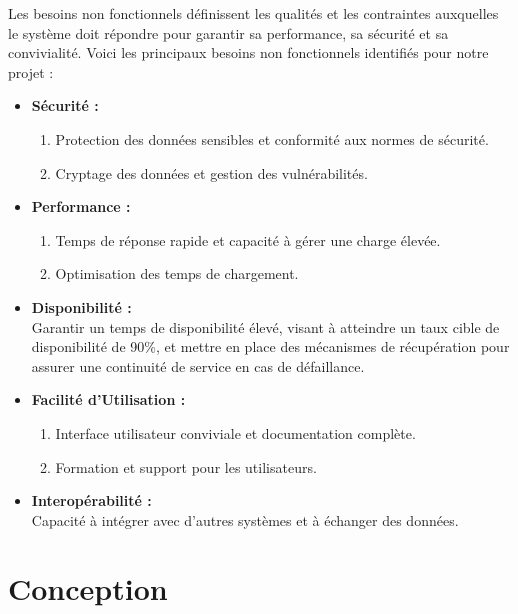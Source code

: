 \hspace{\parindent}Les besoins non fonctionnels définissent les qualités et les contraintes auxquelles le système doit répondre pour garantir sa performance, sa sécurité et sa convivialité. Voici les principaux besoins non fonctionnels identifiés pour notre projet :
\begin{itemize}
    \item \textbf{Sécurité :}
    \begin{enumerate}
        \item Protection des données sensibles et conformité aux normes de sécurité.
        \item Cryptage des données et gestion des vulnérabilités.
    \end{enumerate}

    \item \textbf{Performance :}
        \begin{enumerate}
        \item Temps de réponse rapide et capacité à gérer une charge élevée.
        \item Optimisation des temps de chargement.
        \end{enumerate}

    \item \textbf{Disponibilité :}\\
        Garantir un temps de disponibilité élevé, visant à atteindre un taux cible de disponibilité de 90\%, et mettre en place des mécanismes de récupération pour assurer une continuité de service en cas de défaillance.

    \item \textbf{Facilité d'Utilisation :}
    \begin{enumerate}
        \item Interface utilisateur conviviale et documentation complète.

        \item Formation et support pour les utilisateurs.
    \end{enumerate}

    \item \textbf{Interopérabilité :}\\
    Capacité à intégrer avec d'autres systèmes et à échanger des données.
\end{itemize}






\section{Conception}

